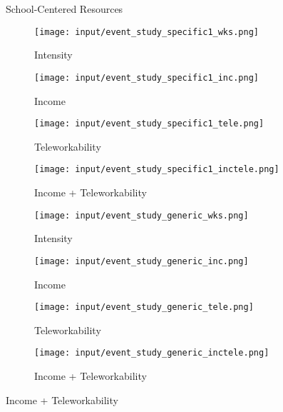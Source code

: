 \begin{figure}
  \caption{School-Centered Resources}
    \centering
    \begin{subfigure}[t]{0.45\textwidth}
    \caption{Intensity}
        \centering
        \texttt{[image: input/event\_study\_specific1\_wks.png]}
    \end{subfigure}%
    \begin{subfigure}[t]{0.45\textwidth}
    \caption{Income}
        \centering
        \texttt{[image: input/event\_study\_specific1\_inc.png]}
    \end{subfigure}%

    \begin{subfigure}{0.45\textwidth}
    \caption{Teleworkability}
        \centering
        \texttt{[image: input/event\_study\_specific1\_tele.png]}
    \end{subfigure}%
    \begin{subfigure}{0.45\textwidth}
    \caption{Income + Teleworkability}
        \centering
        \texttt{[image: input/event\_study\_specific1\_inctele.png]}
    \end{subfigure}%

  \caption{Parent-Centered}
    \centering
    \begin{subfigure}[t]{0.45\textwidth}
    \caption{Intensity}
        \centering
        \texttt{[image: input/event\_study\_generic\_wks.png]}
    \end{subfigure}%
    \begin{subfigure}[t]{0.45\textwidth}
    \caption{Income}
        \centering
        \texttt{[image: input/event\_study\_generic\_inc.png]}
    \end{subfigure}%

    \begin{subfigure}[t]{0.45\textwidth}
    \caption{Teleworkability}
        \centering
        \texttt{[image: input/event\_study\_generic\_tele.png]}
    \end{subfigure}%
    \begin{subfigure}[t]{0.45\textwidth}
    \caption{Income + Teleworkability}
        \centering
        \texttt{[image: input/event\_study\_generic\_inctele.png]}
    \end{subfigure}%
\end{figure}


